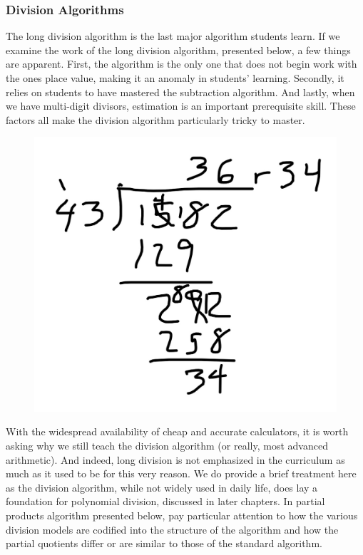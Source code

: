 \documentclass[
]{book}
\theoremstyle{definition}
\theoremstyle{definition}
\theoremstyle{definition}
\theoremstyle{remark}
\begin{document}
\hypertarget{division-algorithms}{%
\subsubsection{Division Algorithms}\label{division-algorithms}}

The long division algorithm is the last major algorithm students learn. If we examine the work of the long division algorithm, presented below, a few things are apparent.
First, the algorithm is the only one that does not begin work with the ones place value, making it an anomaly in students' learning. Secondly, it relies on students to have mastered the subtraction algorithm. And lastly, when we have multi-digit divisors, estimation is an important prerequisite skill. These factors all make the division algorithm particularly tricky to master.

\begin{figure}

{\centering \includegraphics[width=0.6\linewidth]{images/Long_division} 

}

\end{figure}

With the widespread availability of cheap and accurate calculators, it is worth asking why we still teach the division algorithm (or really, most advanced arithmetic). And indeed, long division is not emphasized in the curriculum as much as it used to be for this very reason. We do provide a brief treatment here as the division algorithm, while not widely used in daily life, does lay a foundation for polynomial division, discussed in later chapters. In partial products algorithm presented below, pay particular attention to how the various division models are codified into the structure of the algorithm and how the partial quotients differ or are similar to those of the standard algorithm.
\end{document}
